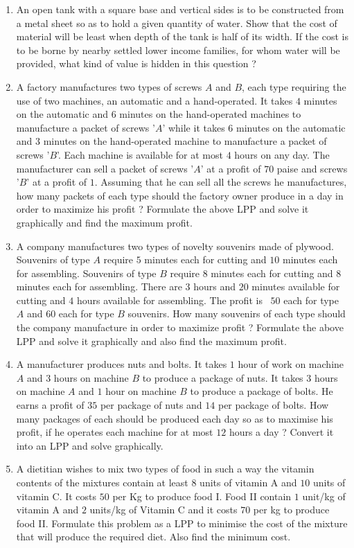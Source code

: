 \begin{enumerate}
\item An open tank with a square base and vertical sides is to be constructed from a metal sheet so as to hold a given quantity of water. Show that the cost of material will be least when depth of the tank is half of its width. If the cost is to be borne by nearby settled lower income families, for whom water will be provided, what kind of value is hidden in this question ?

\item A factory manufactures two types of screws $A$ and $B$, each type requiring the use of two machines, an automatic and a hand-operated. It takes $4$ minutes on the automatic and $6$ minutes on the hand-operated machines to manufacture a packet of screws '$A$' while it takes $6$ minutes on the automatic and $3$ minutes on the hand-operated machine to manufacture a packet of screws '$B$'. Each machine is available for at most $4$ hours on any day. The manufacturer can sell a packet of screws '$A$' at a profit of $70$ paise and screws '$B$' at a profit of \rupee $1$. Assuming that he can sell all the screws he manufactures, how many packets of each type should the factory owner produce in a day in order to maximize his profit ? Formulate the above LPP and solve it graphically and find the maximum profit.

\item A company manufactures two types of novelty souvenirs made of plywood. Souvenirs of type $A$ require $5$ minutes each for cutting and $10$ minutes each for assembling. Souvenirs of type $B$ require $8$ minutes each for cutting and $8$ minutes each for assembling. There are $3$ hours and $20$ minutes available for cutting and $4$ hours available for assembling. The profit is \rupee~$50$ each for type $A$ and \rupee$60$ each for type $B$ souvenirs. How many souvenirs of each type should the company manufacture in order to maximize profit ? Formulate the above LPP and solve it graphically and also find the maximum profit.

\item A manufacturer produces nuts and bolts. It takes $1$ hour of work on machine $A$ and $3$ hours on machine $B$ to produce a package of nuts. It takes $3$ hours on machine $A$ and $1$ hour on machine $B$ to produce a package of bolts. He earns a profit of \rupee$35$ per package of nuts and \rupee$14$ per package of bolts. How many packages of each should be produced each day so as to maximise his profit, if he operates each machine for at most $12$ hours a day ? Convert it into an LPP and solve graphically.
\item A dietitian wishes to mix two types of food in such a way the vitamin contents of the mixtures contain at least $8$ units of vitamin A and $10$ units of vitamin C. It costs \rupee$50$ per Kg to produce food I. Food II contain $1$ unit/kg of vitamin A and $2$ units/kg of Vitamin C and it costs \rupee$70$ per kg to produce food II. Formulate this problem as a LPP to minimise the cost of the mixture that will produce the required diet. Also find the minimum cost.


\end{enumerate}
